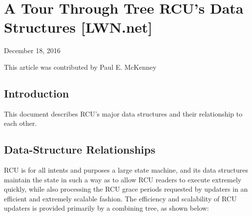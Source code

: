 \section{A Tour Through Tree RCU's Data Structures [LWN.net]}
\label{sec:rcu:A Tour Through Tree RCU's Data Structures}

\begin{Note}
December 18, 2016

This article was contributed by Paul E. McKenney
\end{Note}

\subsection{Introduction}

This document describes RCU's major data structures and their relationship
to each other.

\subsection{Data-Structure Relationships}

RCU is for all intents and purposes a large state machine, and its
data structures maintain the state in such a way as to allow RCU readers
to execute extremely quickly, while also processing the RCU grace periods
requested by updaters in an efficient and extremely scalable fashion.
The efficiency and scalability of RCU updaters is provided primarily
by a combining tree, as shown below:

\begin{center}
\end{center}


